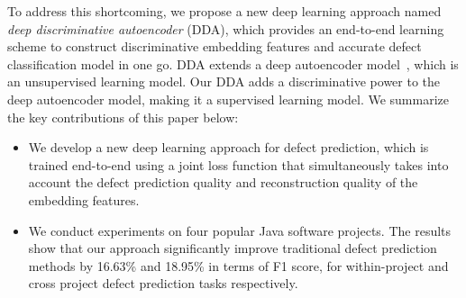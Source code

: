 To address this shortcoming, we propose a new deep learning approach named \emph{deep discriminative autoencoder} (DDA), which provides an end-to-end learning scheme to construct discriminative embedding features and accurate defect classification model in one go. DDA extends a deep autoencoder model~\cite{Vincent2010}, which is an unsupervised learning model. Our DDA adds a discriminative power to the deep autoencoder model, making it a supervised learning model.
We summarize the key contributions of this paper below:
\begin{itemize}
	\item We develop a new deep learning approach for defect prediction, which is trained end-to-end using a joint loss function that simultaneously takes into account the defect prediction quality and reconstruction quality of the embedding features.
	\item We conduct experiments on four popular Java software projects. The results show that our approach significantly improve traditional defect prediction methods by 16.63\% and 18.95\% in terms of F1 score, for within-project and cross project defect prediction tasks respectively. 
\end{itemize}

